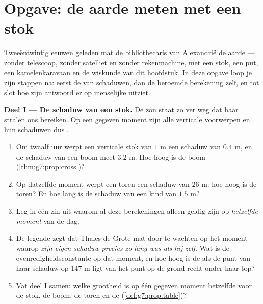 \section{Opgave: de aarde meten met een stok}

\begin{problem}
\label{pb:g7:prop:1}
Tweeëntwintig eeuwen geleden mat de bibliothecaris van Alexandrië de aarde ---
zonder telescoop, zonder satelliet en zonder rekenmachine, met een stok, een put,
een kamelenkaravaan en de wiskunde van dit hoofdstuk. In deze opgave loop je zijn
stappen na: eerst de  van schaduwen, dan de beroemde berekening zelf,
en tot slot hoe zijn antwoord er op menselijke  uitziet.

\medskip
\noindent\textbf{Deel I --- De schaduw van een stok.}
De zon staat zo ver weg dat haar stralen ons  bereiken. Op een gegeven
moment zijn alle verticale voorwerpen en hun schaduwen dus .
\begin{enumerate}
  \item Om twaalf uur werpt een verticale stok van $1$ m een schaduw van $0.4$ m,
        en de schaduw van een boom meet $3.2$ m. Hoe hoog is de boom
        (\cref{thm:g7:prop:cross})?
  \item Op datzelfde moment werpt een toren een schaduw van $26$ m: hoe hoog is de
        toren? En hoe lang is de schaduw van een kind van $1.5$ m?
  \item Leg in één zin uit waarom al deze berekeningen alleen geldig zijn op
        \emph{hetzelfde moment} van de dag.
  \item De legende zegt dat Thales de Grote  mat door te wachten op het
        moment waarop \emph{zijn eigen schaduw precies zo lang was als hij zelf}.
        Wat is de evenredigheidsconstante op dat moment, en hoe hoog is de 
        als de punt van haar schaduw op $147$ m ligt van het punt op de grond recht
        onder haar top?
  \item Vat deel I samen: welke grootheid is op één gegeven moment hetzelfde voor
        de stok, de boom, de toren en de 
        (\cref{def:g7:prop:table})?
\end{enumerate}


\end{problem}
